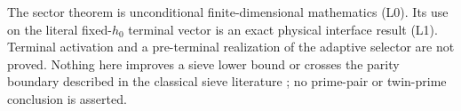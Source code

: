 The sector theorem is unconditional finite-dimensional mathematics (L0).
Its use on the literal fixed-\(h_0\) terminal vector is an exact physical
interface result (L1).  Terminal activation and a pre-terminal realization
of the adaptive selector are not proved.  Nothing here improves a sieve
lower bound or crosses the parity boundary described in the classical
sieve literature \citep{FriedlanderIwaniec2010}; no prime-pair or
twin-prime conclusion is asserted.
